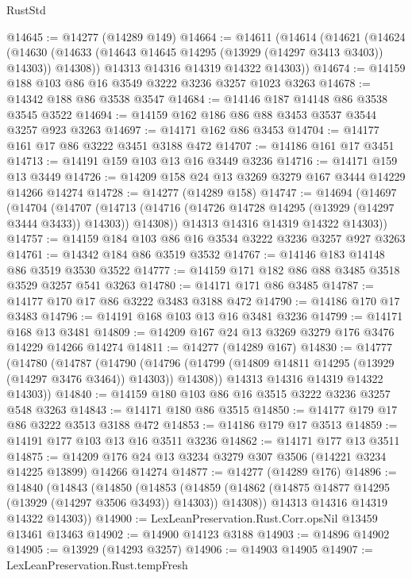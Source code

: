 \begin{lexlean}{RustStd}
\begin{coremodule}
{\begin{coremodule}
{{{{{{{{{{{{{{{{{{{{{{{{{{{{{{{{{{{{{@14645 := @14277 (@14289 @149)
@14664 := @14611
    (@14614
      (@14621
        (@14624
          (@14630 (@14633 (@14643 @14645 @14295 (@13929 (@14297 @3413 @3403)) @14303)) @14308))
        @14313
        @14316
        @14319
        @14322
        @14303))
@14674 := @14159 @188 @103 @86 @16 @3549 @3222 @3236 @3257 @1023 @3263
@14678 := @14342 @188 @86 @3538 @3547
@14684 := @14146 @187 @14148 @86 @3538 @3545 @3522
@14694 := @14159 @162 @186 @86 @88 @3453 @3537 @3544 @3257 @923 @3263
@14697 := @14171 @162 @86 @3453
@14704 := @14177 @161 @17 @86 @3222 @3451 @3188 @472
@14707 := @14186 @161 @17 @3451
@14713 := @14191 @159 @103 @13 @16 @3449 @3236
@14716 := @14171 @159 @13 @3449
@14726 := @14209 @158 @24 @13 @3269 @3279 @167 @3444 @14229 @14266 @14274
@14728 := @14277 (@14289 @158)
@14747 := @14694
    (@14697
      (@14704
        (@14707
          (@14713 (@14716 (@14726 @14728 @14295 (@13929 (@14297 @3444 @3433)) @14303)) @14308))
        @14313
        @14316
        @14319
        @14322
        @14303))
@14757 := @14159 @184 @103 @86 @16 @3534 @3222 @3236 @3257 @927 @3263
@14761 := @14342 @184 @86 @3519 @3532
@14767 := @14146 @183 @14148 @86 @3519 @3530 @3522
@14777 := @14159 @171 @182 @86 @88 @3485 @3518 @3529 @3257 @541 @3263
@14780 := @14171 @171 @86 @3485
@14787 := @14177 @170 @17 @86 @3222 @3483 @3188 @472
@14790 := @14186 @170 @17 @3483
@14796 := @14191 @168 @103 @13 @16 @3481 @3236
@14799 := @14171 @168 @13 @3481
@14809 := @14209 @167 @24 @13 @3269 @3279 @176 @3476 @14229 @14266 @14274
@14811 := @14277 (@14289 @167)
@14830 := @14777
    (@14780
      (@14787
        (@14790
          (@14796 (@14799 (@14809 @14811 @14295 (@13929 (@14297 @3476 @3464)) @14303)) @14308))
        @14313
        @14316
        @14319
        @14322
        @14303))
@14840 := @14159 @180 @103 @86 @16 @3515 @3222 @3236 @3257 @548 @3263
@14843 := @14171 @180 @86 @3515
@14850 := @14177 @179 @17 @86 @3222 @3513 @3188 @472
@14853 := @14186 @179 @17 @3513
@14859 := @14191 @177 @103 @13 @16 @3511 @3236
@14862 := @14171 @177 @13 @3511
@14875 := @14209 @176 @24 @13 @3234 @3279 @307 @3506 (@14221 @3234 @14225 @13899) @14266 @14274
@14877 := @14277 (@14289 @176)
@14896 := @14840
    (@14843
      (@14850
        (@14853
          (@14859 (@14862 (@14875 @14877 @14295 (@13929 (@14297 @3506 @3493)) @14303)) @14308))
        @14313
        @14316
        @14319
        @14322
        @14303))
@14900 := LexLeanPreservation.Rust.Corr.opsNil @13459 @13461 @13463
@14902 := @14900 @14123 @3188
@14903 := @14896 @14902
@14905 := @13929 (@14293 @3257)
@14906 := @14903 @14905
@14907 := LexLeanPreservation.Rust.tempFresh
}}}}}}}}}}}}}}}}}}}}}}}}}}}}}}}}}}}}}
\end{coremodule}}
\end{coremodule}
\end{lexlean}
